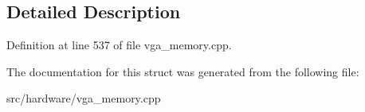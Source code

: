 \subsection{Detailed Description}


Definition at line 537 of file vga\-\_\-memory.\-cpp.



The documentation for this struct was generated from the following file\-:\begin{DoxyCompactItemize}
\item 
src/hardware/vga\-\_\-memory.\-cpp\end{DoxyCompactItemize}

